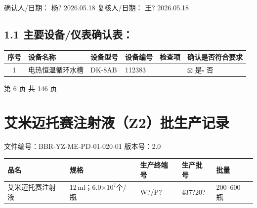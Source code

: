 \documentclass[UTF8,10pt,a4paper,fontset=fandol]{ctexart}
\newcommand{\fieldvalue}[1]{#1}
\newcommand{\handwritten}[1]{#1}
\begin{document}
\vspace{2mm}

确认人/日期：%
\fieldvalue{\handwritten{杨? 2026.05.18}}
\hfill
复核人/日期：%
\fieldvalue{\handwritten{王? 2026.05.18}}

\subsection*{1.1 主要设备/仪表确认表：}

\begin{tabularx}{\textwidth}{|c|X|X|X|X|X|}
\hline
序号 & 设备名称 & 设备型号 & 设备编号 & 检查项 & 确认是否符合要求 \\
\hline
\fieldvalue{1} &
\fieldvalue{电热恒温循环水槽} &
\fieldvalue{DK-8AB} &
\fieldvalue{\handwritten{112383}} &
\underline{\hspace{1.2cm}} &
\fieldvalue{\(\boxtimes\) 是}\quad $\square$ 否 \\
\hline
\end{tabularx}

\begin{center}
第 6 页 共 146 页
\end{center}

\newpage

\section{艾米迈托赛注射液（Z2）批生产记录}

\noindent
文件编号：BBR-YZ-ME-PD-01-020-01 \quad 版本号：2.0

\begin{tabularx}{\textwidth}{|p{2.5cm}|X|p{2.2cm}|p{2.2cm}|p{1.6cm}|}
\hline
品名 & 规格 & 生产终端号 & 生产批号 & 批量 \\
\hline
艾米迈托赛注射液 &
12\,ml；6.0$\times 10^{?}$个/瓶 &
\fieldvalue{\handwritten{W?/P?}} &
\fieldvalue{\handwritten{437?20?}} &
200--600 瓶 \\
\hline
\end{tabularx}
\end{document}
